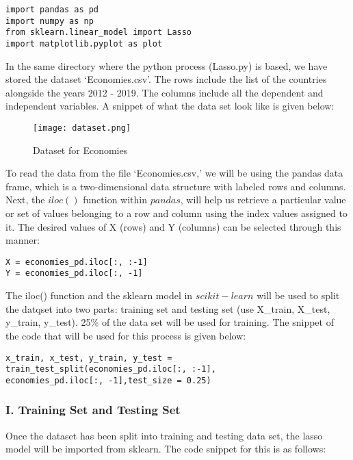 \begin{center}

\begin{verbatim}
import pandas as pd	
import numpy as np
from sklearn.linear_model import Lasso 
import matplotlib.pyplot as plot
\end{verbatim}

\end{center}
\hspace{20pt} In the same directory where the python process (Lasso.py) is based, we have stored the dataset ‘Economies.csv’. The rows include the list of the countries alongside the years 2012 - 2019. The columns include all the dependent and independent variables. A snippet of what the data set look like is given below:

\begin{figure}[htpb]
\centering
\texttt{[image: dataset.png]}
\caption{
        Dataset for Economies
    }
    \label{fig:basics AFM sketch}
\end{figure}

To read the data from the file ‘Economies.csv,’ we will be using the pandas data frame, which is a two-dimensional data structure with labeled rows and columns. Next, the $iloc()$ function within $pandas$, will help us retrieve a particular value or set of values belonging to a row and column using the index values assigned to it. The desired values of X (rows) and Y (columns) can be selected through this manner:

\begin{verbatim}
X = economies_pd.iloc[:, :-1]
Y = economies_pd.iloc[:, -1]
\end{verbatim}

The iloc() function and the sklearn model in $scikit-learn$ will be used to split the datqset into two parts: training set  and testing set (use X\_train, X\_test, y\_train, y\_test). 25\% of the data set will be used for training. The snippet of the code that will be used for this process is given below:

\begin{verbatim}
x_train, x_test, y_train, y_test = train_test_split(economies_pd.iloc[:, :-1],
economies_pd.iloc[:, -1],test_size = 0.25)
\end{verbatim}

\subsubsection{I. Training Set and Testing Set}
\hspace{20pt}Once the dataset has been split into training and testing data set, the lasso model will be imported from sklearn. The code snippet for this is as follows:

